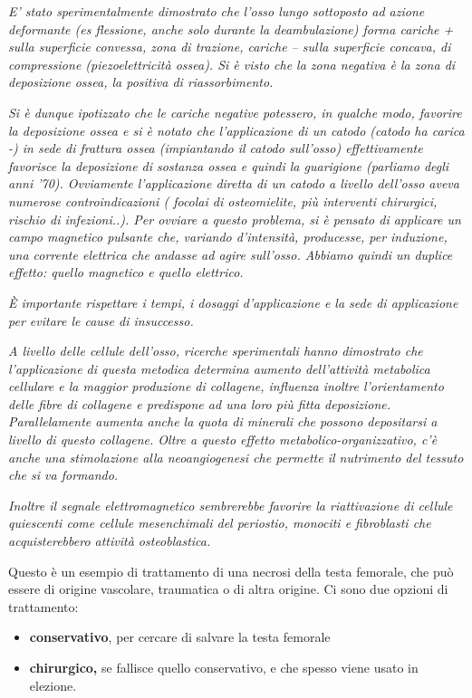 \emph{E' stato sperimentalmente dimostrato che l'osso lungo sottoposto
ad azione deformante (es flessione, anche solo durante la deambulazione)
forma cariche + sulla superficie convessa, zona di trazione, cariche --
sulla superficie concava, di compressione (piezoelettricità ossea). Si è
visto che la zona negativa è la zona di deposizione ossea, la positiva
di riassorbimento.}

\emph{Si è dunque ipotizzato che le cariche negative potessero, in
qualche modo, favorire la deposizione ossea e si è notato che
l'applicazione di un catodo (catodo ha carica -) in sede di frattura
ossea (impiantando il catodo sull'osso) effettivamente favorisce la
deposizione di sostanza ossea e quindi la guarigione (parliamo degli
anni '70). Ovviamente l'applicazione diretta di un catodo a livello
dell'osso aveva numerose controindicazioni ( focolai di osteomielite,
più interventi chirurgici, rischio di infezioni..). Per ovviare a questo
problema, si è pensato di applicare un campo magnetico pulsante che,
variando d'intensità, producesse, per induzione, una corrente elettrica
che andasse ad agire sull'osso. Abbiamo quindi un duplice effetto:
quello magnetico e quello elettrico.}

\emph{È importante rispettare i tempi, i dosaggi d'applicazione e la
sede di applicazione per evitare le cause di insuccesso.}

\emph{A livello delle cellule dell'osso, ricerche sperimentali hanno
dimostrato che l'applicazione di questa metodica determina aumento
dell'attività metabolica cellulare e la maggior produzione di collagene,
influenza inoltre l'orientamento delle fibre di collagene e predispone
ad una loro più fitta deposizione. Parallelamente aumenta anche la quota
di minerali che possono depositarsi a livello di questo collagene. Oltre
a questo effetto metabolico-organizzativo, c'è anche una stimolazione
alla neoangiogenesi che permette il nutrimento del tessuto che si va
formando.}

\emph{Inoltre il segnale elettromagnetico sembrerebbe favorire la
riattivazione di cellule quiescenti come cellule mesenchimali del
periostio, monociti e fibroblasti che acquisterebbero attività
osteoblastica.}

Questo è un esempio di trattamento di una necrosi della testa femorale,
che può essere di origine vascolare, traumatica o di altra origine. Ci
sono due opzioni di trattamento:

\begin{itemize}
\item
  \textbf{conservativo}, per cercare di salvare la testa femorale
\item
  \textbf{chirurgico,} se fallisce quello conservativo, e che spesso
  viene usato in elezione.
\end{itemize}

